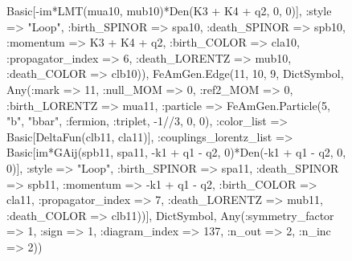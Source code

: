 \documentclass{revtex4}
\begin{document}
\begin{figure}[!htb]
\begin{center}
{Basic[-im*LMT(mua10, mub10)*Den(K3 + K4 + q2, 0, 0)], :style => "Loop", :birth_SPINOR => spa10, :death_SPINOR => spb10, :momentum => K3 + K4 + q2, :birth_COLOR => cla10, :propagator_index => 6, :death_LORENTZ => mub10, :death_COLOR => clb10)), FeAmGen.Edge(11, 10, 9, Dict{Symbol, Any}(:mark => 11, :null_MOM => 0, :ref2_MOM => 0, :birth_LORENTZ => mua11, :particle => FeAmGen.Particle(5, "b", "bbar", :fermion, :triplet, -1//3, 0, 0), :color_list => Basic[DeltaFun(clb11, cla11)], :couplings_lorentz_list => Basic[im*GAij(spb11, spa11, -k1 + q1 - q2, 0)*Den(-k1 + q1 - q2, 0, 0)], :style => "Loop", :birth_SPINOR => spa11, :death_SPINOR => spb11, :momentum => -k1 + q1 - q2, :birth_COLOR => cla11, :propagator_index => 7, :death_LORENTZ => mub11, :death_COLOR => clb11))], Dict{Symbol, Any}(:symmetry_factor => 1, :sign => 1, :diagram_index => 137, :n_out => 2, :n_inc => 2)) 
}
\end{center}
\end{figure}
\end{document}

